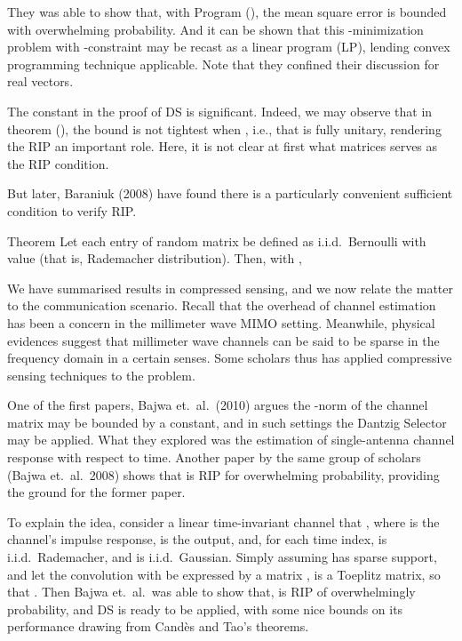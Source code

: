 They was able to show that, with Program (), the mean square error is bounded with overwhelming probability.
And it can be shown that this -minimization problem with \m {\ell_\infty}-constraint may be recast as a linear program (LP), lending convex programming technique applicable.
Note that they confined their discussion for real vectors.

\stopsection
\startsection [title={Sufficient Conditions of RIP}]

The constant \m {\d} in the proof of DS is significant.
Indeed, we may observe that in theorem (), the bound is not tightest when , i.e., that  is fully unitary, rendering the RIP an important role.
Here, it is not clear at first what matrices serves as the RIP condition.

But later, Baraniuk (2008) have found there is a particularly convenient sufficient condition to verify RIP.

\Result
{Theorem}
{
Let each entry of random matrix  be defined as i.i.d.\ Bernoulli with value  (that is, Rademacher distribution).
Then, with ,
%
}

\color[red] {(To be done)}

\stopsection
\startsection [title={Compressed Channel Sensing}]

We have summarised results in compressed sensing, and we now relate the matter to the communication scenario.
Recall that the overhead of channel estimation has been a concern in the millimeter wave MIMO setting.
Meanwhile, physical evidences suggest that millimeter wave channels can be said to be sparse in the frequency domain in a certain senses.
Some scholars thus has applied compressive sensing techniques to the problem.

One of the first papers, Bajwa et.\ al.\ (2010) argues the -norm of the channel matrix may be bounded by a constant, and in such settings the Dantzig Selector may be applied.
What they explored was the estimation of single-antenna channel response with respect to time.
Another paper by the same group of scholars (Bajwa et.\ al.\ 2008) shows that  is RIP for overwhelming probability, providing the ground for the former paper.

To explain the idea, consider a linear time-invariant channel that , where  is the channel's impulse response,  is the output, and, for each time index,  is i.i.d.\ Rademacher, and  is i.i.d.\ Gaussian.
Simply assuming  has sparse support, and let the convolution with  be expressed by a matrix ,  is a Toeplitz matrix, so that .
Then Bajwa et.\ al.\ was able to show that,  is RIP of overwhelmingly probability, and DS is ready to be applied, with some nice bounds on its performance drawing from Cand\`es and Tao's theorems.

